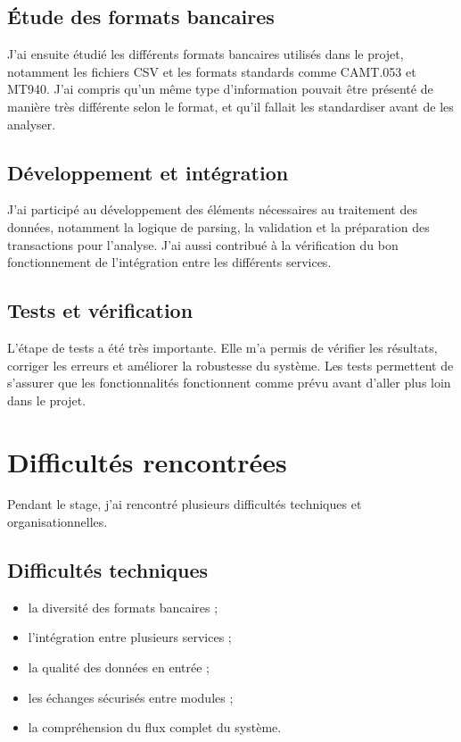﻿\documentclass[12pt,a4paper]{report}
\begin{document}
\section{Étude des formats bancaires}
J'ai ensuite étudié les différents formats bancaires utilisés dans le projet, notamment les fichiers CSV et les formats standards comme CAMT.053 et MT940. J'ai compris qu'un même type d'information pouvait être présenté de manière très différente selon le format, et qu'il fallait les standardiser avant de les analyser.

\section{Développement et intégration}
J'ai participé au développement des éléments nécessaires au traitement des données, notamment la logique de parsing, la validation et la préparation des transactions pour l'analyse. J'ai aussi contribué à la vérification du bon fonctionnement de l'intégration entre les différents services.

\section{Tests et vérification}
L'étape de tests a été très importante. Elle m'a permis de vérifier les résultats, corriger les erreurs et améliorer la robustesse du système. Les tests permettent de s'assurer que les fonctionnalités fonctionnent comme prévu avant d'aller plus loin dans le projet.

\chapter{Difficultés rencontrées}
Pendant le stage, j'ai rencontré plusieurs difficultés techniques et organisationnelles.

\section{Difficultés techniques}
\begin{itemize}[leftmargin=1.5em]
    \item la diversité des formats bancaires ;
    \item l'intégration entre plusieurs services ;
    \item la qualité des données en entrée ;
    \item les échanges sécurisés entre modules ;
    \item la compréhension du flux complet du système.
\end{itemize}
\end{document}
